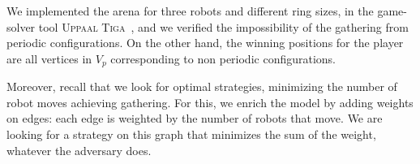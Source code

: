 We implemented the arena for three robots and different ring sizes, 
in the game-solver tool \textsc{Uppaal Tiga}~\cite{UPPAAL-TIGA}, 
and we verified the impossibility of the gathering from periodic configurations.
On the other hand, the winning positions for the player are all vertices in $V_p$ corresponding to non periodic configurations. 

Moreover, recall that we look for optimal strategies, minimizing the number of robot moves achieving gathering. 
For this, we enrich the model by adding weights on edges:  each edge is weighted by the number of robots that move.
We are looking for a strategy on this graph that minimizes the sum of the weight, whatever the adversary does.


